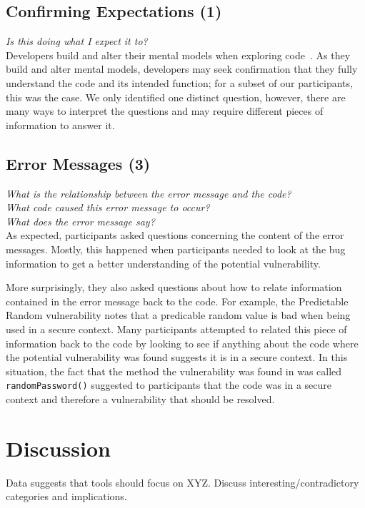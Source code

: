 \documentclass[conference]{IEEEtran}
\begin{document}
\noindent\subsection{\textbf{Confirming Expectations (1)}}

\noindent\emph{Is this doing what I expect it to?} \\

Developers build and alter their mental models when exploring code~\cite{canas1994mental, burkhardt1997mental}. As they build and alter mental models, developers may seek confirmation that they fully understand the code and its intended function; for a subset of our participants, this was the case. We only identified one distinct question, however, there are many ways to interpret the questions and may require different pieces of information to answer it.


\noindent\subsection{\textbf{Error Messages (3)}}

\noindent\emph{What is the relationship between the error message and the code?} \\
\emph{What code caused this error message to occur?} \\
\emph{What does the error message say?} \\

As expected, participants asked questions concerning the content of the error messages. Mostly, this happened when participants needed to look at the bug information to get a better understanding of the potential vulnerability. 

More surprisingly, they also asked questions about how to relate information contained in the error message back to the code. For example, the Predictable Random vulnerability notes that a predicable random value is bad when being used in a secure context. Many participants attempted to related this piece of information back to the code by looking to see if anything about the code where the potential vulnerability was found suggests it is in a secure context. In this situation, the fact that the method the vulnerability was found in was called \texttt{randomPassword()} suggested to participants that the code was in a secure context and therefore a vulnerability that should be resolved.

\section{Discussion}
\label{sec:disc}
Data suggests that tools should focus on XYZ. Discuss interesting/contradictory categories and implications.
\end{document}
